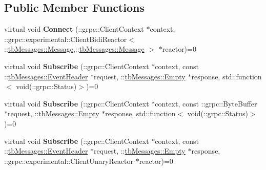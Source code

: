 \subsection*{Public Member Functions}
\begin{DoxyCompactItemize}
\item 
\mbox{\label{classtbMessages_1_1TarboraMessages_1_1StubInterface_1_1experimental__async__interface_a0238a497c5369e4b9c44d8bd73a2f807}} 
virtual void {\bfseries Connect} (\+::grpc\+::\+Client\+Context $\ast$context, \+::grpc\+::experimental\+::\+Client\+Bidi\+Reactor$<$ \+::\hyperlink{classtbMessages_1_1Message}{tb\+Messages\+::\+Message},\+::\hyperlink{classtbMessages_1_1Message}{tb\+Messages\+::\+Message} $>$ $\ast$reactor)=0
\item 
\mbox{\label{classtbMessages_1_1TarboraMessages_1_1StubInterface_1_1experimental__async__interface_ac0c8863d1063081ee1f10cded0f70490}} 
virtual void {\bfseries Subscribe} (\+::grpc\+::\+Client\+Context $\ast$context, const \+::\hyperlink{classtbMessages_1_1EventHeader}{tb\+Messages\+::\+Event\+Header} $\ast$request, \+::\hyperlink{classtbMessages_1_1Empty}{tb\+Messages\+::\+Empty} $\ast$response, std\+::function$<$ void(\+::grpc\+::\+Status)$>$)=0
\item 
\mbox{\label{classtbMessages_1_1TarboraMessages_1_1StubInterface_1_1experimental__async__interface_a1986fe54eda1e0a0c5a94f9cbcb865da}} 
virtual void {\bfseries Subscribe} (\+::grpc\+::\+Client\+Context $\ast$context, const \+::grpc\+::\+Byte\+Buffer $\ast$request, \+::\hyperlink{classtbMessages_1_1Empty}{tb\+Messages\+::\+Empty} $\ast$response, std\+::function$<$ void(\+::grpc\+::\+Status)$>$)=0
\item 
\mbox{\label{classtbMessages_1_1TarboraMessages_1_1StubInterface_1_1experimental__async__interface_a392d730884aba5d51c4bc61c0e386b43}} 
virtual void {\bfseries Subscribe} (\+::grpc\+::\+Client\+Context $\ast$context, const \+::\hyperlink{classtbMessages_1_1EventHeader}{tb\+Messages\+::\+Event\+Header} $\ast$request, \+::\hyperlink{classtbMessages_1_1Empty}{tb\+Messages\+::\+Empty} $\ast$response, \+::grpc\+::experimental\+::\+Client\+Unary\+Reactor $\ast$reactor)=0

\end{DoxyCompactItemize}
